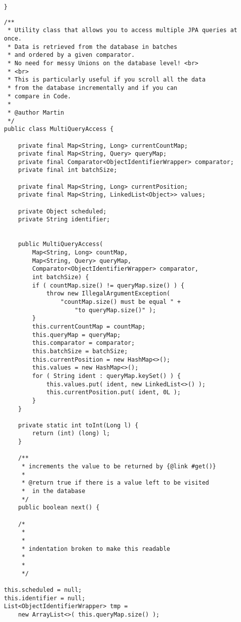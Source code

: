 \begin{lstlisting}[frame=htrbl, caption={generic JPA FullTextEntityManager}, label={lst:FullTextEntityManager.java_generic}]
}
\end{lstlisting}

\pagebreak

\lstset{language=java}
\begin{lstlisting}[frame=htrbl, caption={MultiQueryAccess.java}, label={lst:MultiQueryAccess.java}]
/**
 * Utility class that allows you to access multiple JPA queries at once.
 * Data is retrieved from the database in batches
 * and ordered by a given comparator.
 * No need for messy Unions on the database level! <br>
 * <br>
 * This is particularly useful if you scroll all the data 
 * from the database incrementally and if you can 
 * compare in Code.
 *
 * @author Martin
 */
public class MultiQueryAccess {

	private final Map<String, Long> currentCountMap;
	private final Map<String, Query> queryMap;
	private final Comparator<ObjectIdentifierWrapper> comparator;
	private final int batchSize;
	
	private final Map<String, Long> currentPosition;
	private final Map<String, LinkedList<Object>> values;
	
	private Object scheduled;
	private String identifier;


	public MultiQueryAccess(
		Map<String, Long> countMap,
		Map<String, Query> queryMap,
		Comparator<ObjectIdentifierWrapper> comparator,
		int batchSize) {
		if ( countMap.size() != queryMap.size() ) {
			throw new IllegalArgumentException( 
				"countMap.size() must be equal " + 
					"to queryMap.size()" );
		}
		this.currentCountMap = countMap;
		this.queryMap = queryMap;
		this.comparator = comparator;
		this.batchSize = batchSize;
		this.currentPosition = new HashMap<>();
		this.values = new HashMap<>();
		for ( String ident : queryMap.keySet() ) {
			this.values.put( ident, new LinkedList<>() );
			this.currentPosition.put( ident, 0L );
		}
	}

	private static int toInt(Long l) {
		return (int) (long) l;
	}

	/**
	 * increments the value to be returned by {@link #get()}
	 *
	 * @return true if there is a value left to be visited 
	 *	in the database
	 */
	public boolean next() {
	
	/*
	 *
	 *
	 * indentation broken to make this readable
	 *
	 *
	 */
	
this.scheduled = null;
this.identifier = null;
List<ObjectIdentifierWrapper> tmp =
	new ArrayList<>( this.queryMap.size() );


\end{lstlisting}

